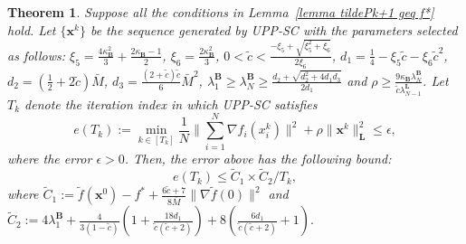 \documentclass[10pt,a4paper]{amsart}
\newtheorem{theorem}{Theorem}
\begin{document}
\begin{theorem}\label{theorem UPP-SC sublinear time-varying Bk}
	Suppose all the conditions in Lemma~\ref{lemma tildePk+1 geq f*} hold. Let $\{\mathbf{x}^k\}$ be the sequence generated by UPP-SC with the parameters selected as follows: $\xi_5=\frac{4\kappa_{\mathbf{B}}^2}{3}+\frac{2\kappa_{\mathbf{B}}-1}{2}$, $\xi_6= \frac{2\kappa_{\mathbf{B}}^2}{3}$, $0<\tilde{c}<\frac{-\xi_5+\sqrt{\xi_5^2+\xi_6}}{2\xi_6}$, $d_1= \frac{1}{4}- \xi_5 \tilde{c}-\xi_6 \tilde{c}^2$, $d_2 = (\frac{1}{2}+2\tilde{c})\bar{M}$, $d_3=\frac{(2+\tilde{c})\tilde{c}}{6}\bar{M}^2$, $\lambda_1^{\mathbf{B}}\geq\lambda_N^{\mathbf{B}}\geq \frac{d_2+\sqrt{d_2^2+4d_1d_3}}{2d_1}$ and $\rho \geq \frac{9\kappa_{\mathbf{B}}\lambda_N^{\mathbf{B}}}{\tilde{c}\lambda_{N-1}^{\mathbf{L}}}$.
	Let $T_k$ denote the iteration index in which UPP-SC satisfies
	\begin{equation}
		e(T_k):= \min_{k\in[T_k]}\frac{1}{N}\|\sum_{i=1}^N \nabla {f}_i(x_i^k)\|^2+\rho\|\mathbf{x}^{k}\|^2_\mathbf{L}\leq \epsilon, \label{eT time-varying Bk}
	\end{equation}
	where the error $\epsilon>0$. Then, the error above has the following bound:
	\begin{equation}
		e(T_k) \leq \tilde{C}_1\times {\tilde{C}_2}/{T_k}, \label{epsilon leq tildeC1C2/T}
	\end{equation}
	where $\tilde{C}_1:= \tilde{f}(\mathbf{x}^0)-f^*+\frac{6\tilde{c}+7}{8\bar{M}}\|\nabla \tilde{f}(0)\|^2$ and $\tilde{C}_2:= 4{\lambda}_1^{\mathbf{B}}+\frac{4}{3(1-\tilde{c})}(1+\frac{18d_1}{\tilde{c}(\tilde{c}+2)})+8(\frac{6d_1}{\tilde{c}(\tilde{c}+2)}+1).$
\end{theorem}
\end{document}
